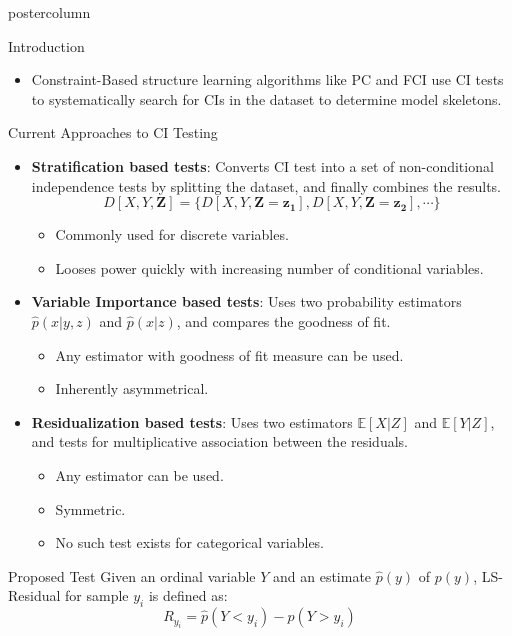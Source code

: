 \documentclass{beamer}
\begin{document}
\begin{frame}
\begin{columns}
\begin{column}{.33\textwidth}
\begin{beamercolorbox}[center]{postercolumn}
\begin{minipage}{.98\textwidth}
{\begin{myblock}{Introduction}
\begin{itemize}
		\item Constraint-Based structure learning algorithms like PC
			and FCI use CI tests to systematically search for CIs
			in the dataset to determine model skeletons.
	\end{itemize}

					\end{myblock}\vfill
					\begin{myblock}{Current Approaches to CI Testing}
						\begin{itemize}
 							\setlength\itemsep{1em}
							\item \textbf{Stratification based tests}: Converts CI
								test into a set of non-conditional independence tests
								by splitting the dataset, and finally combines the
								results.
								$$ D[X, Y, \bm{Z}] = \{ D[X, Y, \bm{Z}=\bm{z_1}], D[X, Y, \bm{Z}=\bm{z_2}], \cdots \} $$
								\vspace{-1.5em}
								\begin{itemize}
									\item Commonly used for discrete variables.
									\item Looses power quickly with increasing number of conditional variables.
								\end{itemize}
							\item \textbf{Variable Importance based tests}: Uses two
								probability estimators $ \hat{p}(x | y, z) $ and $
								\hat{p}(x | z) $, and compares the goodness of fit.
								\begin{itemize}
									\item Any estimator with goodness of fit
										measure can be used.
									\item Inherently asymmetrical.
								\end{itemize}
							\item \textbf{Residualization based tests}: Uses two estimators $
								\mathbb{E}[X | Z] $ and $ \mathbb{E}[Y|Z] $, and tests
								for multiplicative association between the residuals.

								\begin{itemize}
									\item Any estimator can be used.
									\item Symmetric.
									\item No such test exists for categorical variables.
								\end{itemize}
						\end{itemize}
					\end{myblock}\vfill
					\begin{myblock}{Proposed Test}
						Given an ordinal variable $ Y $ and an estimate $ \hat{p}(y) $ of $
						p(y) $, LS-Residual for sample $ y_i $ is defined as:
						$$ R_{y_i} = \hat{p}(Y < y_i) - \hat{p}(Y > y_i) $$


\end{myblock}}
\end{minipage}
\end{beamercolorbox}
\end{column}
\end{columns}
\end{frame}
\end{document}
